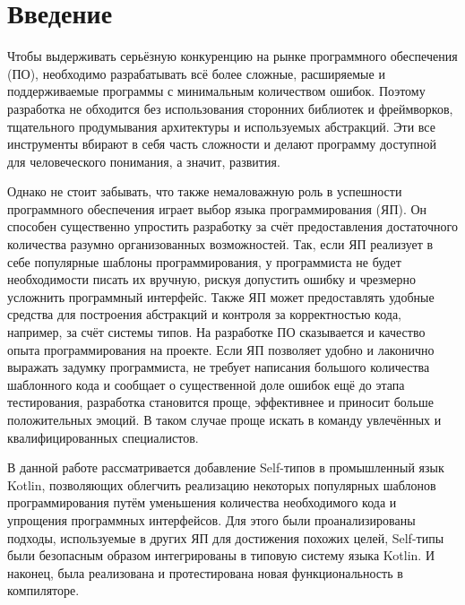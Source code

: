 \section*{Введение}

Чтобы выдерживать серьёзную конкуренцию на рынке программного обеспечения (ПО), необходимо разрабатывать всё более сложные, расширяемые и поддерживаемые программы с минимальным количеством ошибок.
Поэтому разработка не обходится без использования сторонних библиотек и фреймворков, тщательного продумывания архитектуры и используемых абстракций.
Эти все инструменты вбирают в себя часть сложности и делают программу доступной для человеческого понимания, а значит, развития.

Однако не стоит забывать, что также немаловажную роль в успешности программного обеспечения играет выбор языка программирования (ЯП).
Он способен существенно упростить разработку за счёт предоставления достаточного количества разумно организованных возможностей.
Так, если ЯП реализует в себе популярные шаблоны программирования, у программиста не будет необходимости писать их вручную, рискуя допустить ошибку и чрезмерно усложнить программный интерфейс.
Также ЯП может предоставлять удобные средства для построения абстракций и контроля за корректностью кода, например, за счёт системы типов.
На разработке ПО сказывается и качество опыта программирования на проекте.
Если ЯП позволяет удобно и лаконично выражать задумку программиста, не требует написания большого количества шаблонного кода и сообщает о существенной доле ошибок ещё до этапа тестирования, разработка становится проще, эффективнее и приносит больше положительных эмоций.
В таком случае проще искать в команду увлечённых и квалифицированных специалистов.

В данной работе рассматривается добавление Self-типов в промышленный язык Kotlin, позволяющих облегчить реализацию некоторых популярных шаблонов программирования путём уменьшения количества необходимого кода и упрощения программных интерфейсов.
Для этого были проанализированы подходы, используемые в других ЯП для достижения похожих целей, Self-типы были безопасным образом интегрированы в типовую систему языка Kotlin.
И наконец, была реализована и протестирована новая функциональность в компиляторе.

